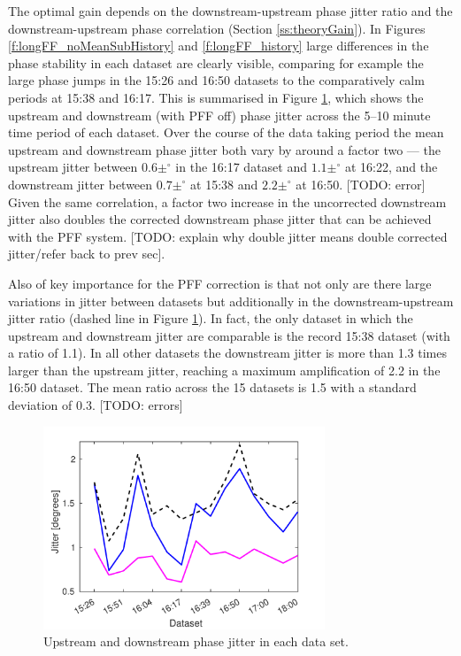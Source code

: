 The optimal gain depends on the downstream-upstream phase jitter ratio and the 
downstream-upstream phase correlation (Section \ref{ss:theoryGain}). In Figures 
\ref{f:longFF_noMeanSubHistory} and \ref{f:longFF_history} large differences in the 
phase stability in each dataset are clearly visible, comparing for example the large 
phase jumps in the 15:26 and 16:50 datasets to the comparatively calm periods at 15:38 
and 16:17. This is summarised in Figure \ref{f:longFF_jitFFOff}, which shows the 
upstream and downstream (with PFF off) phase jitter across the 5--10 minute time period 
of each dataset. Over the course of the data taking period the mean upstream and 
downstream phase jitter both vary by around a factor two --- the upstream jitter 
between \(0.6\pm^\circ\) in the 16:17 dataset and \(1.1\pm^\circ\) at 16:22, and the downstream 
jitter between \(0.7\pm^\circ\) at 15:38 and \(2.2\pm^\circ\) at 16:50. [TODO: error] 
Given the same correlation, a factor two increase in the uncorrected downstream jitter 
also doubles the corrected downstream phase jitter that can be achieved with the PFF 
system. [TODO: explain why double jitter means double corrected jitter/refer back to 
prev sec].


Also of key importance for the PFF correction is that not only are there large 
variations in jitter between datasets but additionally in the downstream-upstream jitter ratio 
(dashed line in Figure \ref{f:longFF_jitFFOff}). In fact, the only dataset in 
which the upstream and downstream jitter are comparable is the record 15:38 dataset 
(with a ratio of 1.1). In all other datasets the downstream jitter is more than 1.3 
times larger than the upstream jitter, reaching a maximum amplification of 2.2 in the 
16:50 dataset. The mean ratio across the 15 datasets is 1.5 with a standard deviation of 0.3. [TODO: errors]


\begin{figure}
  \centering
  \includegraphics[width=0.75\textwidth]{Figures/feedforward/longFF_jitDatSetFFOff}
  \caption{Upstream and downstream phase jitter in each data set.}
  \label{f:longFF_jitFFOff}
\end{figure}

